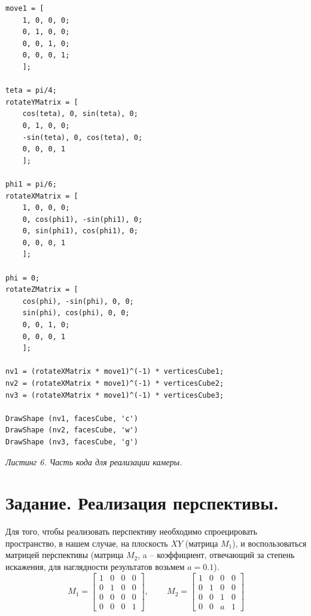 \documentclass[a5paper, 10pt]{article}
\theoremstyle{definition}
\theoremstyle{plain}
\theoremstyle{remark}
\begin{document}
\begin{center}
\begin{lstlisting}
move1 = [
    1, 0, 0, 0;
    0, 1, 0, 0;
    0, 0, 1, 0;
    0, 0, 0, 1;
    ];

teta = pi/4;
rotateYMatrix = [
    cos(teta), 0, sin(teta), 0;
    0, 1, 0, 0;
    -sin(teta), 0, cos(teta), 0;
    0, 0, 0, 1
    ];

phi1 = pi/6;
rotateXMatrix = [
    1, 0, 0, 0;
    0, cos(phi1), -sin(phi1), 0;
    0, sin(phi1), cos(phi1), 0;
    0, 0, 0, 1
    ];

phi = 0;
rotateZMatrix = [
    cos(phi), -sin(phi), 0, 0;
    sin(phi), cos(phi), 0, 0;
    0, 0, 1, 0;
    0, 0, 0, 1
    ];

nv1 = (rotateXMatrix * move1)^(-1) * verticesCube1;
nv2 = (rotateXMatrix * move1)^(-1) * verticesCube2;
nv3 = (rotateXMatrix * move1)^(-1) * verticesCube3;

DrawShape (nv1, facesCube, 'c')
DrawShape (nv2, facesCube, 'w')
DrawShape (nv3, facesCube, 'g')
\end{lstlisting}
\textit{Листинг 6. Часть кода для реализации камеры.}
\end{center}



\newpage
\section{Задание. Реализация перспективы.}

Для того, чтобы реализовать перспективу необходимо спроецировать пространство, в нашем случае, на плоскость $XY$ (матрица $M_1$), и воспользоваться матрицей перспективы (матрица $M_2$, a -- коэффициент, отвечающий за степень искажения, для наглядности результатов возьмем $a=0.1$).
\begin{equation}
M_1 = 
\begin{bmatrix}
 1 & 0 & 0 & 0\\
0 & 1 & 0 & 0 \\
0 & 0 & 0 & 0\\
0 & 0 & 0 & 1
\end{bmatrix}
, \, \, \, \, \, \, \, \, \, \, \, \, \,
M_2 = 
\begin{bmatrix}
 1 & 0 & 0 & 0\\
0 & 1 & 0 & 0 \\
0 & 0 & 1 & 0\\
0 & 0 & a & 1
\end{bmatrix}
\end{equation}
\end{document}
